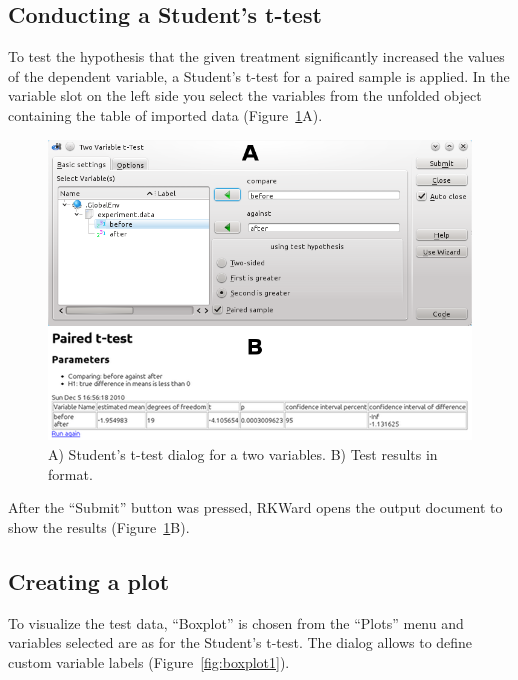 \subsection{Conducting a Student's t-test}
\label{sec:conducting_ttest}
To test the hypothesis that the given treatment significantly increased
the values of the dependent variable, a Student's
t-test for a paired sample is applied. In the variable slot on the left
side you select the variables from the unfolded
 object containing the table of imported data (Figure~\ref{fig:t_test}A).

\begin{figure}[htp]
 \centering
 \includegraphics[width=15.5cm]{../figures/t-test.png}
 \caption{A) Student's t-test dialog for a two variables. B) Test results in  format.}
 \label{fig:t_test}
\end{figure}

After the ``Submit'' button was pressed, RKWard opens the output document
to show the results (Figure~\ref{fig:t_test}B).

\subsection{Creating a plot}
\label{sec:create_plot}
To visualize the test data, ``Boxplot'' is chosen from the ``Plots'' menu
and variables selected are as for the Student's t-test.
The dialog allows to define custom variable labels (Figure~\ref{fig:boxplot1}).

